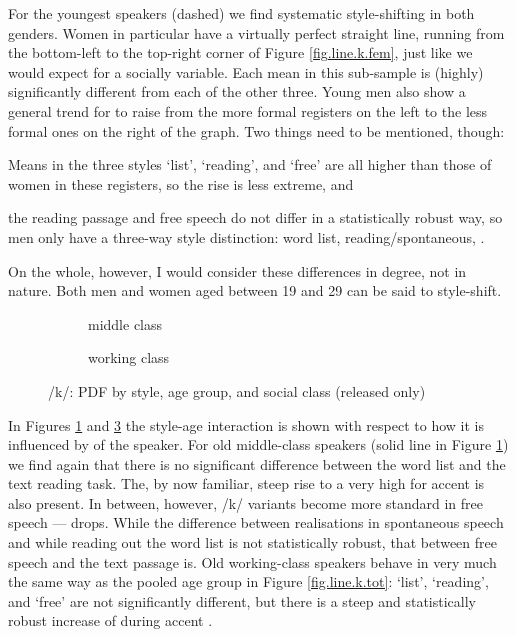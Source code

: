 For the youngest speakers (dashed) we find systematic style-shifting in both genders.
Women in particular have a virtually perfect straight line, running from the bottom-left to the top-right corner of Figure \ref{fig.line.k.fem}, just like we would expect for a socially  variable.
Each mean in this sub-sample is (highly) significantly different from each of the other three.
Young men also show a general trend for  to raise from the more formal registers on the left to the less formal ones on the right of the graph.
Two things need to be mentioned, though:
\begin{inparaenum}[(1)]
	\item Means in the three styles `list', `reading', and `free' are all higher than those of women in these registers, so the rise is less extreme, and
	\item the reading passage and free speech do not differ in a statistically robust way, so men only have a three-way style distinction: word list, reading/spontaneous, .
\end{inparaenum}
On the whole, however, I would consider these differences in degree, not in nature.
Both men and women aged between 19 and 29 can be said to style-shift.

\begin{figure}[h]
	\centering
	\begin{subfigure}{.49\textwidth}
		\centering
			\resizebox{\linewidth}{!}{} 
		\caption{middle class}
		\label{fig.line.k.mc}
	\end{subfigure}
	\begin{subfigure}{.49\textwidth}
		\centering
			\resizebox{\linewidth}{!}{} 
		\caption{working class}
		\label{fig.line.k.wc}
	\end{subfigure}
	\caption{/k/: PDF by style, age group, and social class (released only)}
\end{figure}

In Figures \ref{fig.line.k.mc} and \ref{fig.line.k.wc} the style-age interaction is shown with respect to how it is influenced by  of the speaker.
For old middle-class speakers (solid line in Figure \ref{fig.line.k.mc}) we find again that there is no significant difference between the word list and the text reading task.
The, by now familiar, steep rise to a very high  for accent  is also present.
In between, however, /k/ variants become more standard in free speech ---  drops.
While the difference between realisations in spontaneous speech and while reading out the word list is not statistically robust, that between free speech and the text passage is.
Old working-class speakers behave in very much the same way as the pooled age group in Figure \ref{fig.line.k.tot}: `list', `reading', and `free' are not significantly different, but there is a steep and statistically robust increase of  during accent .

